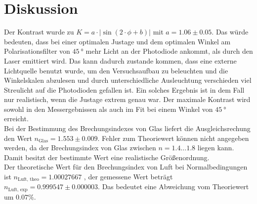 \section{Diskussion}

Der Kontrast wurde zu $K = a \cdot | \sin (2 \cdot \phi + b) |$ mit $a = 1.06 \pm 0.05$. Das würde
bedeuten, dass bei einer optimalen Justage und dem optimalen Winkel am Polarisationsfilter von
$\SI{45}{\degree}$ mehr Licht an der Photodiode ankommt, als durch den Laser emittiert wird. Das kann
dadurch zustande kommen, dass eine externe Lichtquelle benutzt wurde, um den Versuchsaufbau zu beleuchten
und die Winkelskalen abzulesen und durch unterschiedliche Ausleuchtung verschieden viel Streulicht
auf die Photodioden gefallen ist. Ein solches Ergebnis ist in dem Fall nur realistisch, wenn die
Justage extrem genau war. Der maximale Kontrast wird sowohl in den Messergebnissen als auch im Fit bei
einem Winkel von $\SI{45}{\degree}$ erreicht.\\
\newline
Bei der Bestimmung des Brechungsindexes von Glas liefert die Ausgleichsrechung den Wert
$n_\text{Glas} = 1.553 \pm 0.009$. Fehler zum Theoriewert können nicht angegeben werden, da der
Brechungsindex von Glas zwischen $n = 1.4 \dots 1.8$ \cite{n} liegen kann. Damit besitzt der bestimmte
Wert eine realistische Größenordnung.\\
\newline
Der theoretische Wert für den Brechungsindex von Luft bei Normalbedingungen ist
$n_\text{Luft, theo} = 1.00027667$ \cite{n}, der gemessene Wert beträgt
$n_\text{Luft, exp} = 0.999547 \pm 0.000003$. Das bedeutet eine Abweichung vom Theoriewert um
$0.07\%$.
